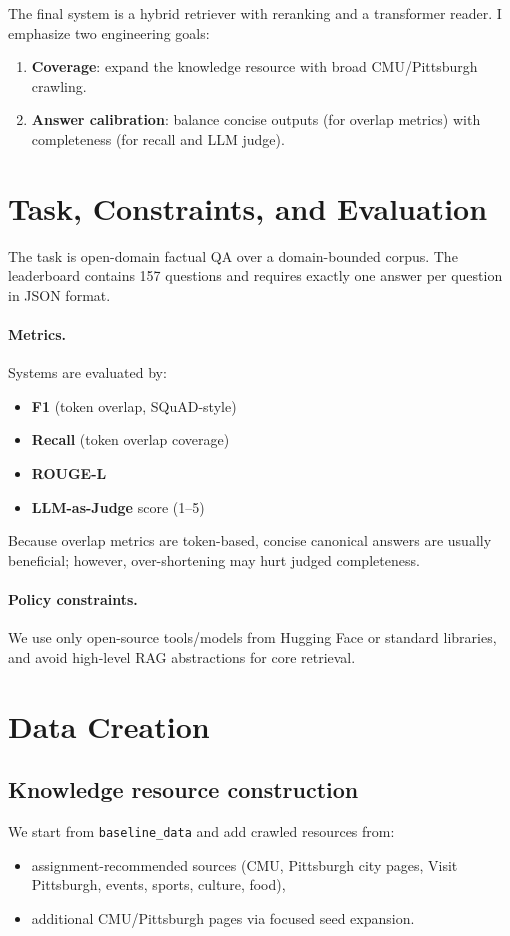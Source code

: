 \documentclass[11pt,twocolumn]{article}
\begin{document}
The final system is a hybrid retriever with reranking and a transformer reader. I emphasize two engineering goals:
\begin{enumerate}
    \item \textbf{Coverage}: expand the knowledge resource with broad CMU/Pittsburgh crawling.
    \item \textbf{Answer calibration}: balance concise outputs (for overlap metrics) with completeness (for recall and LLM judge).
\end{enumerate}

\section{Task, Constraints, and Evaluation}
The task is open-domain factual QA over a domain-bounded corpus. The leaderboard contains 157 questions and requires exactly one answer per question in JSON format.

\paragraph{Metrics.}
Systems are evaluated by:
\begin{itemize}
    \item \textbf{F1} (token overlap, SQuAD-style) \citep{rajpurkar2016squad}
    \item \textbf{Recall} (token overlap coverage)
    \item \textbf{ROUGE-L} \citep{lin2004rouge}
    \item \textbf{LLM-as-Judge} score (1--5)
\end{itemize}
Because overlap metrics are token-based, concise canonical answers are usually beneficial; however, over-shortening may hurt judged completeness.

\paragraph{Policy constraints.}
We use only open-source tools/models from Hugging Face or standard libraries, and avoid high-level RAG abstractions for core retrieval.

\section{Data Creation}
\subsection{Knowledge resource construction}
We start from \texttt{baseline\_data} and add crawled resources from:
\begin{itemize}
    \item assignment-recommended sources (CMU, Pittsburgh city pages, Visit Pittsburgh, events, sports, culture, food),
    \item additional CMU/Pittsburgh pages via focused seed expansion.
\end{itemize}
\end{document}

